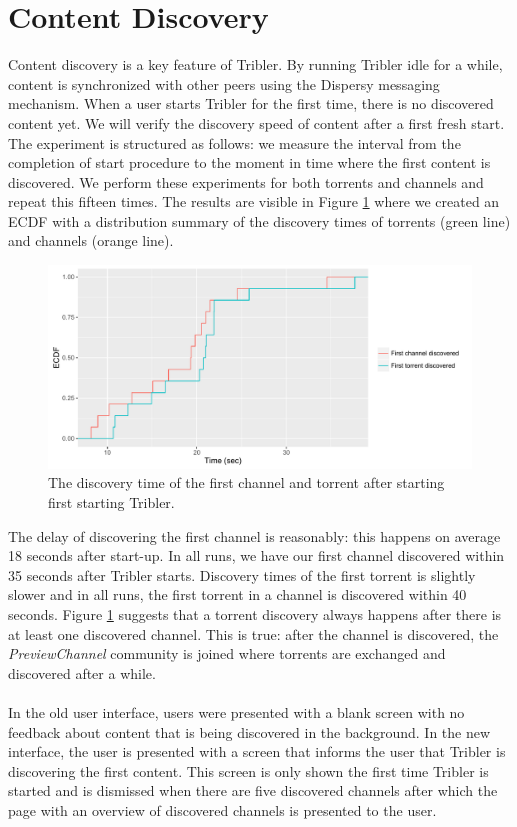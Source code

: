 \section{Content Discovery}
\label{sec:content-discovery}
Content discovery is a key feature of Tribler. By running Tribler idle for a while, content is synchronized with other peers using the Dispersy messaging mechanism. When a user starts Tribler for the first time, there is no discovered content yet. We will verify the discovery speed of content after a first fresh start. The experiment is structured as follows: we measure the interval from the completion of start procedure to the moment in time where the first content is discovered. We perform these experiments for both torrents and channels and repeat this fifteen times. The results are visible in Figure \ref{fig:content_discovery_speed} where we created an ECDF with a distribution summary of the discovery times of torrents (green line) and channels (orange line).\\

\begin{figure}[!h]
	\centering
	\includegraphics[width=1.0\columnwidth]{images/experiments/content_discovery}
	\caption{The discovery time of the first channel and torrent after starting first starting Tribler.}
	\label{fig:content_discovery_speed}
\end{figure}

The delay of discovering the first channel is reasonably: this happens on average 18 seconds after start-up. In all runs, we have our first channel discovered within 35 seconds after Tribler starts. Discovery times of the first torrent is slightly slower and in all runs, the first torrent in a channel is discovered within 40 seconds. Figure \ref{fig:content_discovery_speed} suggests that a torrent discovery always happens after there is at least one discovered channel. This is true: after the channel is discovered, the \emph{PreviewChannel} community is joined where torrents are exchanged and discovered after a while.\\\\
In the old user interface, users were presented with a blank screen with no feedback about content that is being discovered in the background. In the new interface, the user is presented with a screen that informs the user that Tribler is discovering the first content. This screen is only shown the first time Tribler is started and is dismissed when there are five discovered channels after which the page with an overview of discovered channels is presented to the user.

